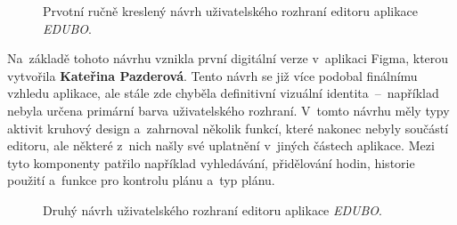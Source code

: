 \documentclass[male,czech,api_bc]{kitheses}
\begin{document}
\begin{figure}[H]
	\centering
	\caption{Prvotní ručně kreslený návrh uživatelského rozhraní editoru aplikace \textit{EDUBO}.}
	\label{fig:edubo-navrh-1}
\end{figure}

Na~základě tohoto návrhu vznikla první digitální verze v~aplikaci Figma, kterou vytvořila \textbf{Kateřina Pazderová}. Tento návrh se již více podobal finálnímu vzhledu aplikace, ale stále zde chyběla definitivní vizuální identita~--~například nebyla určena primární barva uživatelského rozhraní. V~tomto návrhu měly typy aktivit kruhový design a~zahrnoval několik funkcí, které nakonec nebyly součástí editoru, ale některé z~nich našly své uplatnění v~jiných částech aplikace. Mezi tyto komponenty patřilo například vyhledávání, přidělování hodin, historie použití a~funkce pro kontrolu plánu a~typ plánu.

\begin{figure}[H]
	\centering
	\caption{Druhý návrh uživatelského rozhraní editoru aplikace \textit{EDUBO}.}
	\label{fig:edubo-navrh-2}
\end{figure}
\end{document}
